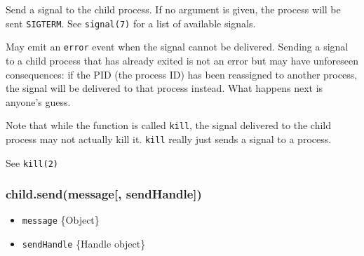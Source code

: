 Send a signal to the child process. If no argument is given, the process
will be sent \texttt{\textquotesingle{}SIGTERM\textquotesingle{}}. See
\texttt{signal(7)} for a list of available signals.

\begin{Shaded}
\begin{Highlighting}[]
 \NormalTok{(}\NormalTok{,}
    \NormalTok{(}\NormalTok{, [}\NormalTok{]);}

\NormalTok{(}\NormalTok{, } 
  \NormalTok{(}
\NormalTok{\});}

\NormalTok{(}\NormalTok{);}
\end{Highlighting}
\end{Shaded}

May emit an \texttt{\textquotesingle{}error\textquotesingle{}} event
when the signal cannot be delivered. Sending a signal to a child process
that has already exited is not an error but may have unforeseen
consequences: if the PID (the process ID) has been reassigned to another
process, the signal will be delivered to that process instead. What
happens next is anyone's guess.

Note that while the function is called \texttt{kill}, the signal
delivered to the child process may not actually kill it. \texttt{kill}
really just sends a signal to a process.

See \texttt{kill(2)}

\subsubsection{child.send(message{[},
sendHandle{]})}\label{child.sendmessage-sendhandle}

\begin{itemize}
\itemsep1pt\parskip0pt
\item
  \texttt{message} \{Object\}
\item
  \texttt{sendHandle} \{Handle object\}
\end{itemize}

